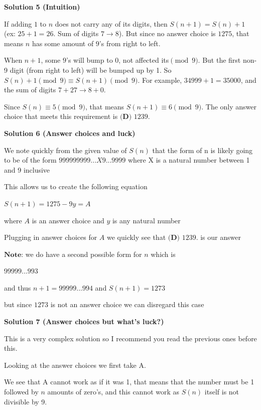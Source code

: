 \begin{enumerate}
 



\textbf{Solution 5 (Intuition)}

If adding $1$ to $n$ does not carry any of its digits, then $S(n+1)=S(n)+1$ (ex: $25+1=26$. Sum of digits $7 \rightarrow 8$). But since no answer choice is $1275$, that means $n$ has some amount of $9$'s from right to left. 

 When $n+1$, some $9$'s will bump to 0, not affected its$\pmod 9$. But the first non-9 digit (from right to left) will be bumped up by 1. So $S(n) + 1 \pmod {9} \equiv S(n+1) \pmod{9}$. For example, $34999+1=35000$, and the sum of digits $7+27 \rightarrow 8+0$.

 Since $S(n) \equiv 5 \pmod{9}$, that means $S(n+1) \equiv 6 \pmod{9}$. The only answer choice that meets this requirement is $\boxed{\textbf{(D) } 1239}.$




\textbf{Solution 6 (Answer choices and luck)}

We note quickly from the given value of $S(n)$ that the form of n is likely going to be of the form $999999999...X9...9999$  where X is a natural number between 1 and 9 inclusive

 This allows us to create the following equation

 
$S(n+1)=1275 - 9y= A$

 where $A$ is an answer choice and $y$ is any natural number

 Plugging in answer choices for $A$ we quickly see that $\boxed{\textbf{(D) } 1239}.$ is our answer

 $\textbf{Note}$: we do have a second possible form for $n$ which is 

 $99999...993$ 

 and thus $n+1 = 99999...994$ and $S(n+1)=1273$

 but since $1273$ is not an answer choice we can disregard this case

 



\textbf{Solution 7 (Answer choices but what's luck?)}

This is a very complex solution so I recommend you read the previous ones before this.

 Looking at the answer choices we first take A.

 We see that A cannot work as if it was 1, that means that the number must be 1 followed by \( n \) amounts of zero's, and this cannot work as \( S(n) \) itself is not divisible by 9.


\end{enumerate}
